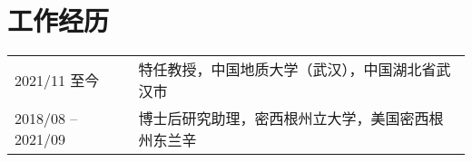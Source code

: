 \section*{工作经历}

\begin{tabular}{p{} p{}}
2021/11 至今 & 特任教授，中国地质大学（武汉），中国湖北省武汉市 \\
2018/08 -- 2021/09 & 博士后研究助理，密西根州立大学，美国密西根州东兰辛 \\
\end{tabular}

